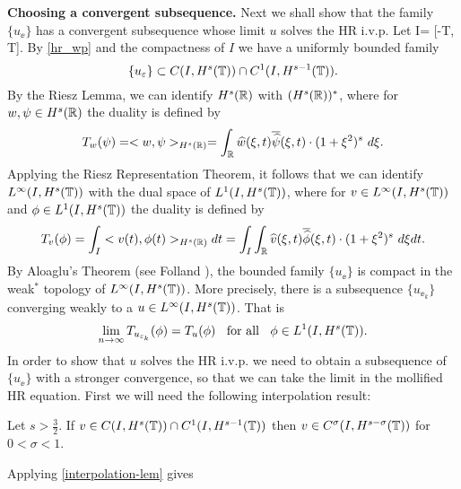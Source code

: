 \textbf{Choosing  a convergent subsequence.}
%
Next we shall show that  the family $\{ u_\ee\}$ has a convergent 
subsequence
whose limit $u$ solves the HR i.v.p.  Let I= [-T, T]. By  \cref{hr_wp} and the compactness of $I$ we have a uniformly bounded 
family
%
%
%
\begin{equation*}
\label{Lip-1-fam}
\{u_\varepsilon\}\subset C(I, H^s(\mathbb{T}))\cap C^1(I,
H^{s-1}(\mathbb{T})).
\end{equation*}
%
%
%
%
By the Riesz Lemma, we can identify $H^s(\mathbb{R})$ with
$(H^s(\mathbb{R}))^*$, where for $w, \psi \in H^s(\mathbb{R})$ the duality is
defined by 
\begin{equation*}
	T_w(\psi) = <w, \psi>_{H^s(\mathbb{R})} = \int_{\mathbb{R}}
\widehat{w}(\xi, t) \overline{\widehat{\psi}}(\xi, t) \cdot (1
+ \xi^2)^s \ d \xi.
\end{equation*}
Applying the Riesz Representation Theorem, it follows that we 
can identify \\ $L^\infty(I, H^s(\mathbb{T})) $ with the dual space of $L^1(I,
H^{s}(\mathbb{T}))$, where for $v\in L^\infty(I, H^s(\mathbb{T})) $ and $ \phi \in
L^1(I, H^{s}(\mathbb{T}))$ the duality is defined by  
%
%
%
\begin{equation}
T_v(\phi) = \int_I <v (t), \phi (t)>_{H^s(\mathbb{R})} dt  = \int_I
\int_{\mathbb{R}}
\widehat{v}(\xi, t) \overline{\widehat{\phi}}(\xi, t) \cdot (1
+ \xi^2)^s \ d \xi dt.
\end{equation}
%
%
%
By Aloaglu's Theorem (see Folland \cite{Folland_1999_Real-analysis}), the bounded family $\{u_\ee\}$ is compact in the weak$^*$ topology of 
$L^\infty(I, H^s(\mathbb{T}))$. More precisely,
there is a subsequence  $\{ u_{\ee_k} \}$ converging
weakly to a $ u\in L^{\infty}(I, H^s(\mathbb{T}))$.
That is 
%
%
%
\begin{equation*}
\label{weak-conv}
\lim_{n\to \infty} T_{u_{\varepsilon_k}}(\phi)  =  T_u (\phi) \; \;		\text{ for 
all } \;\;  \phi \in L^1(I, H^{s}(\mathbb{T})).
\end{equation*}
%
%
%
In order to show that $u$ solves the HR i.v.p. we need to obtain a 
subsequence of $\{u_{\ee}\}$ with a stronger convergence, so that we can take 
the limit in the mollified HR equation. First we will need the following 
interpolation result:
%
%
%
%
\begin{lemma}[Interpolation]
\label{interpolation-lem}
Let  $s > \frac{3}{2}$.
If $v \in C(I, H^s(\mathbb{T})) \cap C^1(I, H^{s-1}(\mathbb{T}))$
then $v \in C^\sigma (I, H^{s- \sigma}(\mathbb{T}))$ for  $0 < \sigma < 1$.
\end{lemma}
%
Applying \cref{interpolation-lem} gives 
